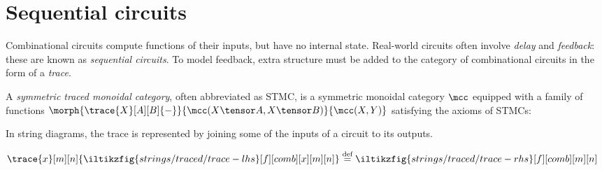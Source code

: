 \section{Sequential circuits}

Combinational circuits compute functions of their inputs, but have no internal
state.
Real-world circuits often involve \emph{delay} and \emph{feedback}: these are
known as \emph{sequential circuits}.
To model feedback, extra structure must be added to the category of
combinational circuits in the form of a \emph{trace}.

\begin{definition}
    \cite{joyal1996traced}
    A \emph{symmetric traced monoidal category}, often abbreviated as STMC, is a
    symmetric monoidal category \(\mcc\) equipped with a family of functions
    \(
        \morph{
            \trace{X}[A][B]{-}
        }{
            \mcc(X \tensor A, X \tensor B)
        }{
            \mcc(X, Y)
        }
    \) satisfying the axioms of STMCs:
\end{definition}

In string diagrams, the trace is represented by joining some of the
inputs of a circuit to its outputs.

\begin{center}
    \(
        \trace{x}[m][n]{\iltikzfig{strings/traced/trace-lhs}[f][comb][x][m][n]}
        \stackrel{\text{def}}{=}
        \iltikzfig{strings/traced/trace-rhs}[f][comb][m][n]
    \)
\end{center}